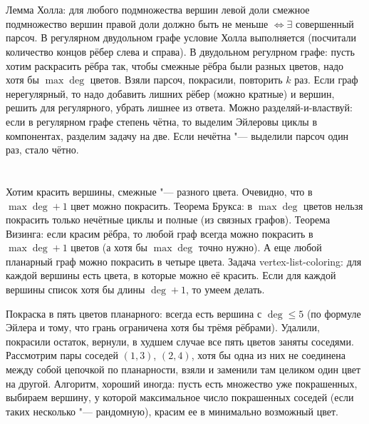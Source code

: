 \section{} %
\TODO

\section{} %
Лемма Холла: для любого подмножества вершин левой доли смежное подмножество вершин правой доли должно быть не меньше $\iff \exists$ совершенный парсоч.
В регулярном двудольном графе условие Холла выполняется (посчитали количество концов рёбер слева и справа).
В двудольном регулрном графе: пусть хотим раскрасить рёбра так, чтобы смежные рёбра были разных цветов, надо хотя бы $\max \deg$ цветов.
Взяли парсоч, покрасили, повторить $k$ раз.
Если граф нерегулярный, то надо добавить лишних рёбер (можно кратные) и вершин, решить для регулярного, убрать лишнее из ответа.
Можно разделяй-и-властвуй: если в регулярном графе степень чётна, то выделим Эйлеровы циклы в компонентах, разделим задачу на две.
Если нечётна "--- выделили парсоч один раз, стало чётно.

\section{} %
Хотим красить вершины, смежные "--- разного цвета.
Очевидно, что в $\max \deg +1$ цвет можно покрасить.
Теорема Брукса: в $\max \deg$ цветов нельзя покрасить только нечётные циклы и полные (из связных графов).
Теорема Визинга: если красим рёбра, то любой граф всегда можно покрасить в $\max \deg + 1$ цветов (а хотя бы $\max \deg$ точно нужно).
А еще любой планарный граф можно покрасить в четыре цвета.
Задача vertex-list-coloring: для каждой вершины есть цвета, в которые можно её красить.
Если для каждой вершины список хотя бы длины $\deg + 1$, то умеем делать.

Покраска в пять цветов планарного: всегда есть вершина с $\deg \le 5$ (по формуле Эйлера и тому, что грань ограничена хотя бы трёмя рёбрами).
Удалили, покрасили остаток, вернули, в худшем случае все пять цветов заняты соседями.
Рассмотрим пары соседей $(1,3)$, $(2,4)$, хотя бы одна из них не соединена между собой цепочкой по планарности, взяли и заменили там целиком один цвет на другой.
Алгоритм, хороший иногда: пусть есть множество уже покрашенных,
выбираем вершину, у которой максимальное число покрашенных соседей (если таких несколько "--- рандомную), красим ее в минимально возможный цвет.

